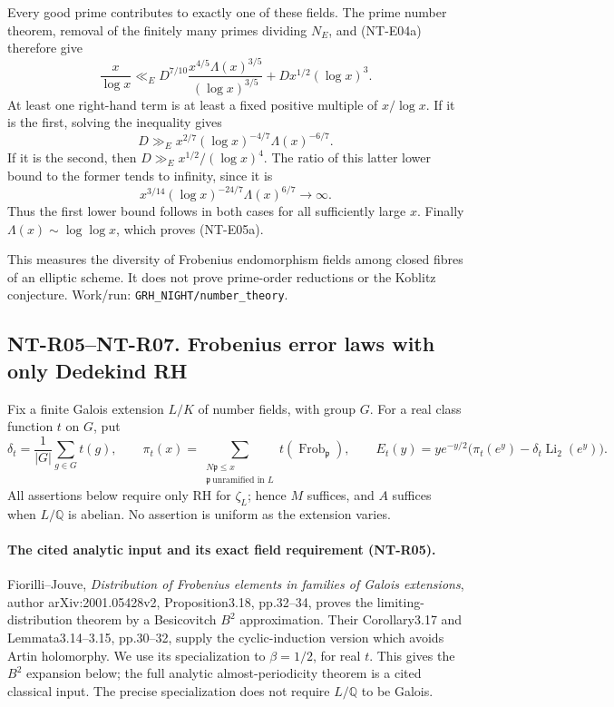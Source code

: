 Every good prime contributes to exactly one of these fields.
The prime number theorem, removal of the finitely many primes
dividing $N_E$, and (NT-E04a) therefore give
\[
 \frac{x}{\log x}\ll_E
    D^{7/10}\frac{x^{4/5}\Lambda(x)^{3/5}}{(\log x)^{3/5}}
                      +D x^{1/2}(\log x)^3.               \tag{NT-E05c}
\]
At least one right-hand term is at least a fixed positive
multiple of $x/\log x$. If it is the first, solving the
inequality gives
\[
 D\gg_E x^{2/7}(\log x)^{-4/7}\Lambda(x)^{-6/7}.
\]
If it is the second, then $D\gg_E x^{1/2}/(\log x)^4$.
The ratio of this latter lower bound to the former tends to
infinity, since it is
\[
 x^{3/14}(\log x)^{-24/7}\Lambda(x)^{6/7}\longrightarrow\infty.
\]
Thus the first lower bound follows in both cases for all
sufficiently large $x$. Finally
$\Lambda(x)\sim\log\log x$, which proves (NT-E05a).

This measures the diversity of Frobenius endomorphism fields
among closed fibres of an elliptic scheme. It does not prove
prime-order reductions or the Koblitz conjecture. Work/run:
\texttt{GRH\_NIGHT/number\_theory}.

\subsection*{NT-R05--NT-R07. Frobenius error laws with only Dedekind RH}

Fix a finite Galois extension $L/K$ of number fields, with group $G$.
For a real class function $t$ on $G$, put
\[
 \delta_t=\frac1{|G|}\sum_{g\in G}t(g),\qquad
 \pi_t(x)=\sum_{\substack{N\mathfrak p\le x\\\mathfrak p\ \text{unramified in }L}}
 t(\operatorname{Frob}_{\mathfrak p}),\qquad
 E_t(y)=ye^{-y/2}\bigl(\pi_t(e^y)-\delta_t\operatorname{Li}_2(e^y)\bigr).
\]
All assertions below require only RH for $\zeta_L$; hence $M$ suffices,
and $A$ suffices when $L/\mathbb Q$ is abelian. No assertion is uniform
as the extension varies.

\paragraph{The cited analytic input and its exact field requirement (NT-R05).}
Fiorilli--Jouve, \emph{Distribution of Frobenius elements in families of
Galois extensions}, author arXiv:2001.05428v2, Proposition3.18,
pp.32--34, proves the limiting-distribution theorem by a
Besicovitch $B^2$ approximation. Their Corollary3.17 and
Lemmata3.14--3.15, pp.30--32, supply the cyclic-induction version
which avoids Artin holomorphy. We use its specialization to
$\beta=1/2$, for real $t$. This gives the $B^2$ expansion below;
the full analytic almost-periodicity theorem is a cited classical
input. The precise specialization does not require $L/\mathbb Q$
to be Galois.

